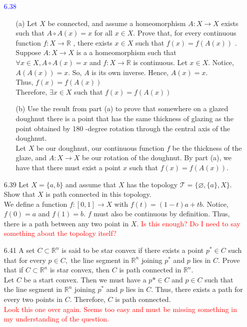 \documentclass[12pt]{article}
\newcommand{\R}{\mathbb{R}}
\begin{document}
\begin{enumerate}
		\item[\textcolor{blue}{6.38}] \begin{enumerate}
			\item[(a)] Let $X$ be connected, and assume a homeomorphism $A : X \rightarrow X$ exists
			such that $A \circ A ( x ) = x$ for all $x \in X .$ Prove that, for every continuous
			function $f : X \rightarrow \mathbb { R }$ , there exists $x \in X$ such that $f ( x ) = f ( A ( x ) )$ .\\
			Suppose $ A:X\rightarrow X $ is a a homeomorphism such that $ \forall x \in X, A\circ A(x) =x$ and $ f:X\rightarrow \R $ is continuous. Let $ x\in X $. Notice, $ A(A(x))=x $. So, $ A $ is its own inverse. Hence, $ A(x)=x $.\\
			Thus, $ f(x)=f(A(x)) $\\
			Therefore, $ \exists x\in X $ such that $ f(x)=f(A(x)) $ 
			\item[(b)] Use the result from part (a) to prove that somewhere on a glazed doughnut
			there is a point that has the same thickness of glazing as the point obtained
			by 180 -degree rotation through the central axis of the doughnut. \\
			Let $ X $ be our doughnut, our continuous function $ f $ be the thickness of the glaze, and $ A: X \rightarrow X $ be our rotation of the doughnut. By part (a), we have that there must exist a point $ x $ such that $ f(x)=f(A(x)) $. 
		\end{enumerate}
		
		\item[6.39] Let $X = \{ a , b \}$ and assume that $X$ has the topology $\mathcal { T } = \{ \varnothing , \{ a \} , X \} .$ Show that $X$ is path connected in this topology.\\
		We define a function $ f:[0,1]\rightarrow X $ with $ f(t)=(1-t)a+tb $. Notice, $ f(0)=a $ and $ f(1)=b $. $ f $ must also be continuous by definition. Thus, there is a path between any two point in $ X $.
		\textcolor{red}{Is this enough? Do I need to say something about the topology itself?}
		
		\item[6.41] A set $C \subset \mathbb { R } ^ { n }$ is said to be star convex if there exists a point $p ^ { * } \in C$ such that
		for every $p \in C ,$ the line segment in $\mathbb { R } ^ { n }$ joining $p ^ { * }$ and $p$ lies in $C .$ Prove that
		if $C \subset \mathbb { R } ^ { n }$ is star convex, then $C$ is path connected in $\mathbb { R } ^ { n } .$\\
		Let $ C $ be a start convex. Then we must have a $ p*\in C $ and $ p\in C $ such that the line segment in $ \R^n $ joining $ p^* $ and $ p $ lies in $ C $. Thus, there exists a path for every two points in $ C $. Therefore, $ C $ is path connected.\\
		\textcolor{red}{Look this one over again. Seems too easy and must be missing something in my understanding of the question.}
		

\end{enumerate}
\end{document}
